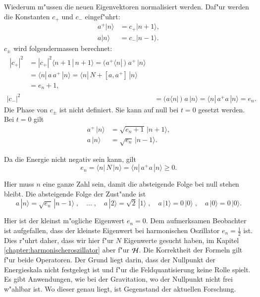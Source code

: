 \begin{refsection}
Wiederum m"ussen die neuen Eigenvektoren normalisiert werden. Daf"ur werden die Konstanten $c_+$ und $c_-$ eingef"uhrt:
\begin{align*}
a^+|n\rangle &= c_+|n+1\rangle, \\
a|n\rangle &= c_-|n-1\rangle.
\end{align*}
$c_\pm$ wird folgendermassen berechnet:
\begin{align*}
\begin{split}
	|c_+|^2 &= |c_+|^2 \langle n+1 \, | \, n+1 \rangle = ( a^+ \langle n |\,) \; a^+ \,| n \rangle \\
		&= \langle n |\, a \, a^+ \,|n \rangle = \langle n |\, N + [a,a^+] \,|n \rangle \\
		&= e_n+1,
\end{split}\\
	|c_-|^2 &= 	( a \langle n |\,) \; a \,| n \rangle = \langle n |\, a^+ a \,| n \rangle = e_n.
\end{align*}
Die Phase von $c_{\pm}$ ist nicht definiert. Sie kann auf null bei $t=0$ gesetzt werden. Bei $t=0$ gilt
\begin{align*}
a^+\,|n\rangle &= \sqrt{e_n+1}\,|n+1\rangle, \\
a\,|n\rangle &= \sqrt{e_n}\,|n-1\rangle.
\end{align*}

Da die Energie nicht negativ sein kann, gilt
\begin{equation*}
e_n = \langle n |\, N \,|n \rangle = \langle n |\, a^+a \,|n \rangle \geq 0.
\end{equation*}

Hier muss $n$ eine ganze Zahl sein, damit die absteigende Folge bei null stehen bleibt. Die absteigende Folge der Zust"ande ist
\begin{equation*}
a\,|n\rangle = \sqrt{e_n}\,|n-1\rangle  \;, \quad \hdots \; , \quad a\,|2\rangle = \sqrt{2}\,|1\rangle \; , \quad a\,|1\rangle = 0\,|0\rangle \;, \quad a\,|0\rangle = 0\,|0\rangle.
\end{equation*}

Hier ist der kleinst m"ogliche Eigenwert $e_n = 0$. Dem aufmerksamen Beobachter ist aufgefallen, dass der kleinste Eigenwert bei harmonischen Oszillator $e_n = \frac{1}{2}$ ist. Dies r"uhrt daher, dass wir hier f"ur $N$ Eigenwerte gesucht haben, im Kapitel \ref{chapter:harmonischeroszillator} aber f"ur ${\cal H}$. Die Korrektheit der Formeln gilt f"ur beide Operatoren. Der Grund liegt darin, dass der Nullpunkt der Energieskala nicht festgelegt ist und f"ur die Feldquantisierung keine Rolle spielt. Es gibt Anwendungen, wie bei der Gravitation, wo der Nullpunkt nicht frei w"ahlbar ist. Wo dieser genau liegt, ist Gegenstand der aktuellen Forschung.


\end{refsection}
